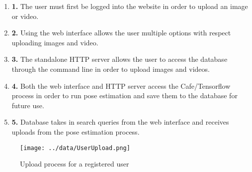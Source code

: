 \documentclass{scrreprt}
\begin{document}
\begin{enumerate}
  \item \textbf {1.} The user must first be logged into the website in order to upload an image or video.
  \item \textbf {2.} Using the web interface allows the user multiple options with respect uploading images and video.
  \item \textbf {3.} The standalone HTTP server allows the user to access the database through the command line in order to upload images and videos.
  \item \textbf {4.} Both the web interface and HTTP server access the Cafe/Tensorflow process in order to run pose estimation and save them to the database for future use.
  \item \textbf {5.} Database takes in search queries from the web interface and receives uploads from the pose estimation process.
\end{enumerate}


\begin{figure}[!ht]
        \caption{Upload process for a registered user}
        \label{mediaUpload}
        \centering
        \texttt{[image: ../data/UserUpload.png]}
\end{figure}
\end{document}
